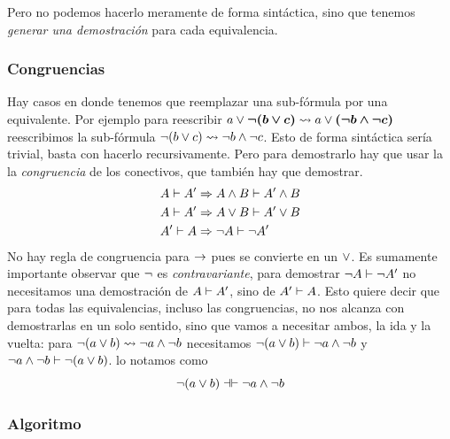 Pero no podemos hacerlo meramente de forma sintáctica, sino que tenemos
\textit{generar una demostración} para cada equivalencia.

\subsubsection{Congruencias}

Hay casos en donde tenemos que reemplazar una sub-fórmula por una equivalente.  Por ejemplo para reescribir
\(
    a \vee \bm{\neg (b \vee c)}
    \rightsquigarrow
    a \vee \bm{(\neg b \wedge \neg c)}
\)
reescribimos la sub-fórmula $\neg
(b \vee
c) \rightsquigarrow \neg b \wedge \neg c$.
Esto de forma sintáctica sería trivial, basta con hacerlo recursivamente. Pero para demostrarlo hay que usar la la
\textit{congruencia} de los conectivos, que también hay que demostrar.
\begin{align*}
    A \vdash A'
        &\Rightarrow A \wedge B \vdash A' \wedge B\\
    A \vdash A'
        &\Rightarrow A \vee B \vdash A' \vee B\\
    A' \vdash A
        &\Rightarrow \neg A \vdash \neg A'
\end{align*}
No hay regla de congruencia para $\to$ pues se convierte en un $\vee$. Es
sumamente importante observar que $\neg$ es \textit{contravariante}, para
demostrar $\neg A \vdash \neg A'$ no necesitamos una demostración
de $A \vdash A'$, sino de $A' \vdash A$. Esto quiere decir que
para todas las equivalencias, incluso las congruencias, no nos alcanza con
demostrarlas en un solo sentido, sino que vamos a necesitar ambos, la
ida y la vuelta: para $\neg(a \vee b) \rightsquigarrow
\neg a \wedge \neg b$ necesitamos
\(
    \neg(a \vee b)
        \vdash \neg a \wedge \neg b
\) y \(
    \neg a \wedge \neg b \vdash \neg(a \vee b)
\). lo notamos como \[
    \neg(a \vee b)
        \dashv\vdash \neg a \wedge \neg b
\]

\subsubsection{Algoritmo}



